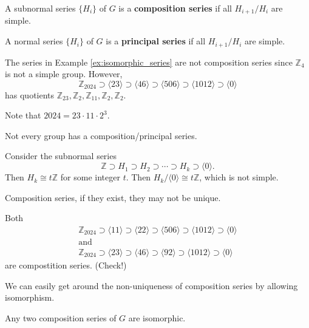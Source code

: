 \begin{definition}
	A subnormal series $\{H_i\}$ of $G$ is a \textbf{composition series} if all $H_{i+1}/H_i$ are simple.

	A normal series $\{H_i\}$ of $G$ is a \textbf{principal series} if all $H_{i+1}/H_i$ are simple.
\end{definition}

\begin{example}
	The series in Example \ref{ex:isomorphic_series} are not composition series since $\mathbb Z_4$ is not a simple group. However,
	$$\mathbb Z_{2024}\supset\langle 23\rangle\supset\langle 46\rangle\supset\langle 506\rangle\supset\langle 1012\rangle\supset\langle 0\rangle$$
	has quotients $\mathbb Z_{23},\mathbb Z_2,\mathbb Z_{11},\mathbb Z_2,\mathbb Z_2$.

	Note that $2024=23\cdot 11\cdot 2^3$.
\end{example}

\begin{remark}
	Not every group has a composition/principal series.
\end{remark}

\begin{example}
	Consider the subnormal series
	$$\mathbb Z\supset H_1\supset H_2\supset\cdots\supset H_k\supset\langle 0\rangle.$$
	Then $H_k\cong t\mathbb Z$ for some integer $t$. Then $H_k/\langle 0\rangle\cong t\mathbb Z$, which is not simple.
\end{example}

\begin{remark}
	Composition series, if they exist, they may not be unique.
\end{remark}

\begin{example}
	Both
	\begin{gather*}
		\mathbb Z_{2024}\supset\langle 11\rangle\supset\langle 22\rangle\supset\langle 506\rangle\supset\langle 1012\rangle\supset\langle 0\rangle\\
		\text{and}\\
		\mathbb Z_{2024}\supset\langle 23\rangle\supset\langle 46\rangle\supset\langle 92\rangle\supset\langle 1012\rangle\supset\langle 0\rangle
	\end{gather*}
	are compostition series. (Check!)
\end{example}

We can easily get around the non-uniqueness of composition series by allowing isomorphism.

\begin{theorem}
	Any two composition series of $G$ are isomorphic.
\end{theorem}

